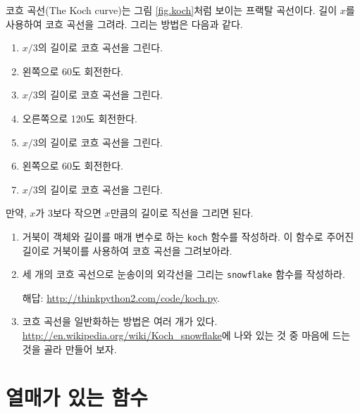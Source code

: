 \documentclass[10pt]{book}
\begin{document}
\begin{exercise}

코흐 곡선(The Koch curve)는 그림 \ref{fig.koch}처럼 보이는 프랙탈
곡선이다. 길이 $x$를 사용하여 코흐 곡선을 그려라.  그리는 방법은 다음과
같다.


\begin{enumerate}

\item $x/3$의 길이로 코흐 곡선을 그린다.

\item 왼쪽으로 60도 회전한다. 

\item $x/3$의 길이로 코흐 곡선을 그린다.

\item 오른쪽으로 120도 회전한다. 

\item $x/3$의 길이로 코흐 곡선을 그린다.

\item 왼쪽으로 60도 회전한다. 

\item $x/3$의 길이로 코흐 곡선을 그린다.

\end{enumerate}

만약, $x$가 3보다 작으면 $x$만큼의 길이로 직선을 그리면 된다. 

\begin{enumerate}

\item 거북이 객체와 길이를 매개 변수로 하는 {\tt koch} 함수를
  작성하라.  이 함수로 주어진 길이로 거북이를 사용하여 코흐 곡선을
  그려보아라.

\item 세 개의 코흐 곡선으로 눈송이의 외각선을 그리는 {\tt snowflake}
  함수를 작성하라.

해답: \url{http://thinkpython2.com/code/koch.py}.

\item 코흐 곡선을 일반화하는 방법은 여러 개가
  있다. \url{http://en.wikipedia.org/wiki/Koch_snowflake}에 나와 있는
  것 중 마음에 드는 것을 골라 만들어 보자.

\end{enumerate}
\end{exercise}


\chapter{열매가 있는 함수}
\label{fruitchap}
\end{document}
